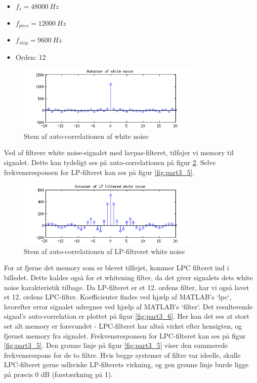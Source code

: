 \begin{itemize}
	\item $f_s = 48000\ Hz$
	\item $f_{pass} = 12000\ Hz$
	\item $f_{stop} = 9600\ Hz$
	\item Orden: 12
\end{itemize} 

\begin{figure}[!ht]
	\centering
	\includegraphics[width=0.8\textwidth]{resources/part3_white_noise_xcorr}
 	\caption{Stem af auto-correlationen af white noise}
 	\label{fig:part3_3}
\end{figure}

Ved af filtrere white noise-signalet med lavpas-filteret, tilføjer vi memory til signalet. Dette kan tydeligt ses på auto-correlationen på figur \ref{fig:part3_4}. Selve frekvensresponsen for LP-filteret kan ses på figur \ref{fig:part3_5}.

\begin{figure}[!ht]
	\centering
	\includegraphics[width=0.8\textwidth]{resources/part3_lp_filtered_white_noise_xcorr}
 	\caption{Stem af auto-correlationen af LP-filtreret white noise}
 	\label{fig:part3_4}
\end{figure}

For at fjerne det memory som er blevet tilføjet, kommer LPC filteret ind i billedet. Dette kaldes også for et whitening filter, da det giver signalets dets white noise karakteristik tilbage. Da LP-filteret er et 12. ordens filter, har vi også lavet et 12. ordens LPC-filter. Koefficienter findes ved hjælp af MATLAB's `lpc`, hvorefter error signalet udregnes ved hjælp af MATLAB's `filter`. Det resulterende signal's auto-correlation er plottet på figur \ref{fig:part3_6}. Her kan det ses at stort set alt memory er forsvundet - LPC-filteret har altså virket efter hensigten, og fjernet memory fra signalet. Frekvensresponsen for LPC-filteret kan ses på figur \ref{fig:part3_5}. Den grønne linje på figur \ref{fig:part3_5} viser den summerede frekvensrespons for de to filtre. Hvis begge systemer of filtre var ideelle, skulle LPC-filteret gerne udhviske LP-filterets virkning, og gen grønne linje burde ligge på præcis 0 dB (forstærkning på 1). 

